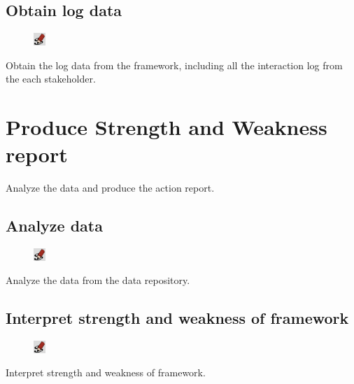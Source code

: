 \documentclass[11pt,oneside]{book}
\begin{document}
\section{Obtain log data}
\begin{shadebox}
\begin{figure}
\vspace{-15pt}\hspace{-10pt}
    \includegraphics[width=0.04\textwidth]{note-icon}
\end{figure}
Obtain the log data from the framework, including all the interaction log from the each stakeholder.
\end{shadebox}

\chapter{Produce Strength and Weakness report}

Analyze the data and produce the action report.

\section{Analyze data}
\begin{shadebox}
\begin{figure}
\vspace{-15pt}\hspace{-10pt}
    \includegraphics[width=0.04\textwidth]{note-icon}
\end{figure}
Analyze the data from the data repository.
\end{shadebox}

\section{Interpret strength and weakness of framework}
\begin{shadebox}
\begin{figure}
\vspace{-15pt}\hspace{-10pt}
    \includegraphics[width=0.04\textwidth]{note-icon}
\end{figure}
Interpret strength and weakness of framework.
\end{shadebox}
\end{document}
